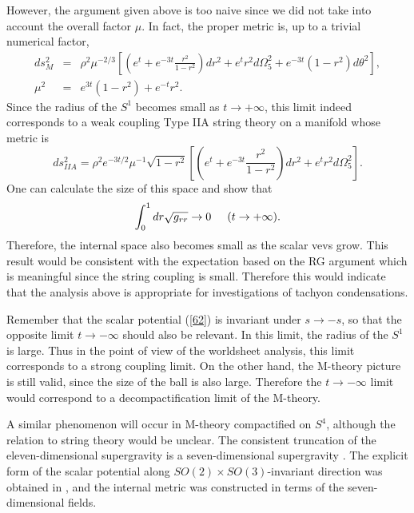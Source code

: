 \documentclass[a4paper,a4paper]{article}
\begin{document}
However, the argument given above is too naive since we did not take into account the overall factor $\mu$. 
In fact, the proper metric is, up to a trivial numerical factor,
\begin{eqnarray}
ds^2_M &=& \rho^2\mu^{-2/3}
    \left[ \left(e^t+e^{-3t}\frac{r^2}{1-r^2}\right)dr^2+e^tr^2d\Omega_5^2+e^{-3t}(1-r^2)d\theta^2\right], \\
\mu^2 &=& e^{3t}(1-r^2)+e^{-t}r^2.
\end{eqnarray}
Since the radius of the $S^1$ becomes small as $t\to+\infty$, this limit indeed 
corresponds to a weak coupling Type IIA 
string theory on a manifold whose metric is 
\begin{equation}
ds^2_{IIA} = \rho^2e^{-3t/2}\mu^{-1}\sqrt{1-r^2}
        \left[ \left(e^t+e^{-3t}\frac{r^2}{1-r^2}\right)dr^2+e^tr^2d\Omega_5^2 \right].
\end{equation}
One can calculate the size of this space and show that 
\begin{equation}
\int_0^1dr\sqrt{g_{rr}} \to 0\hspace{5mm} (t\to +\infty).
\end{equation}
Therefore, the internal space also becomes small as the scalar vevs grow. 
This result would be consistent with the expectation based on the RG argument which is meaningful since the string 
coupling is small. 
Therefore this would indicate that the analysis above is appropriate for investigations of tachyon 
condensations. 

Remember that the scalar potential (\ref{62}) is invariant under $s\to-s$, so that the opposite limit 
$t\to-\infty$ should 
also be relevant. 
In this limit, the radius of the $S^1$ is large. 
Thus in the point of view of the worldsheet analysis, this limit corresponds to a strong coupling limit. 
On the other hand, the M-theory picture is still valid, since the size of the ball is also large. 
Therefore the $t\to-\infty$ limit would correspond to a decompactification limit of the M-theory. 

\vspace{3mm}

A similar phenomenon will occur in M-theory compactified on $S^4$, although the relation to string theory would 
be unclear. 
The consistent truncation of the eleven-dimensional supergravity is a seven-dimensional supergravity \cite{7dim}. 
The explicit form of the scalar potential along $SO(2)\times SO(3)$-invariant direction was obtained in 
\cite{7dimpotential}, and 
the internal metric was constructed \cite{embed7dim} in terms of the seven-dimensional fields. 
\end{document}
